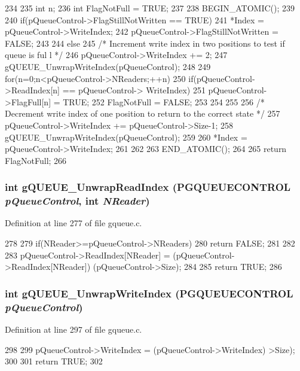 \begin{DoxyCode}
234 {
235         int n;
236         int     FlagNotFull = TRUE;
237 
238 BEGIN_ATOMIC();
239     
240     if(pQueueControl->FlagStillNotWritten == TRUE){
241         *Index = pQueueControl->WriteIndex;
242         pQueueControl->FlagStillNotWritten = FALSE;
243         }
244     else{
245                 /* Increment write index in two positions to test if queue is ful
      l */
246         pQueueControl->WriteIndex += 2; 
247         gQUEUE_UnwrapWriteIndex(pQueueControl);
248         
249                 for(n=0;n<pQueueControl->NReaders;++n){    
250                         if(pQueueControl->ReadIndex[n] == pQueueControl->
      WriteIndex){
251                                 pQueueControl->FlagFull[n] = TRUE;
252                                 FlagNotFull = FALSE;
253                         }
254                 }
255 
256                 /* Decrement write index of one position to return to the correct
       state */
257         pQueueControl->WriteIndex += pQueueControl->Size-1; 
258         gQUEUE_UnwrapWriteIndex(pQueueControl);
259 
260                 *Index = pQueueControl->WriteIndex;
261     }
262 
263 END_ATOMIC();
264 
265     return FlagNotFull;
266 }                      
\end{DoxyCode}
\subsubsection[{gQUEUE\_\-UnwrapReadIndex}]{\setlength{\rightskip}{0pt plus 5cm}int gQUEUE\_\-UnwrapReadIndex ({\bf PGQUEUECONTROL} {\em pQueueControl}, \/  int {\em NReader})}\label{gqueue_8c_abab4c6aeb3d57e43aa16285fe4f59f66}


Definition at line 277 of file gqueue.c.


\begin{DoxyCode}
278 {
279         if(NReader>=pQueueControl->NReaders){
280                 return FALSE;
281         }
282 
283         pQueueControl->ReadIndex[NReader] = (pQueueControl->ReadIndex[NReader]) %
       (pQueueControl->Size); 
284   
285         return TRUE;
286 }                      
\end{DoxyCode}
\subsubsection[{gQUEUE\_\-UnwrapWriteIndex}]{\setlength{\rightskip}{0pt plus 5cm}int gQUEUE\_\-UnwrapWriteIndex ({\bf PGQUEUECONTROL} {\em pQueueControl})}\label{gqueue_8c_a070de567ba00fb02d6c480840c15d31d}


Definition at line 297 of file gqueue.c.


\begin{DoxyCode}
298 {
299         pQueueControl->WriteIndex = (pQueueControl->WriteIndex) %
      >Size); 
300         
301         return TRUE;
302 }                      
\end{DoxyCode}
